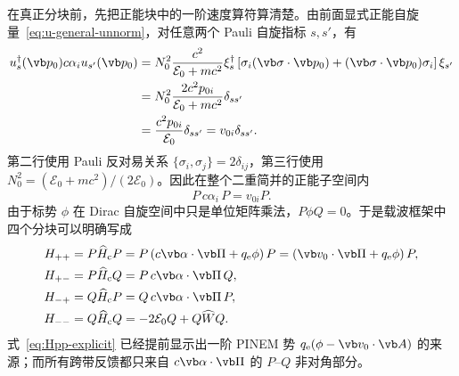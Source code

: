 在真正分块前，先把正能块中的一阶速度算符算清楚。由前面显式正能自旋量~\cref{eq:u-general-unnorm}，对任意两个 Pauli 自旋指标 $s,s'$，有
\begin{align}
 u_s^\dagger(\vb p_0)c\alpha_i u_{s'}(\vb p_0)
 &=N_0^2\frac{c^2}{\mathcal E_0+mc^2}
 \xi_s^\dagger
 \left[\sigma_i(\vb\sigma\cdot\vb p_0)
 +(\vb\sigma\cdot\vb p_0)\sigma_i\right]\xi_{s'}\\
 &=N_0^2\frac{2c^2p_{0i}}{\mathcal E_0+mc^2}
 \delta_{ss'}\\
 &=\frac{c^2p_{0i}}{\mathcal E_0}\delta_{ss'}
 =v_{0i}\delta_{ss'}.
\label{eq:projected-alpha-velocity-explicit}
\end{align}
第二行使用 Pauli 反对易关系
$\{\sigma_i,\sigma_j\}=2\delta_{ij}$，第三行使用
$N_0^2=(\mathcal E_0+mc^2)/(2\mathcal E_0)$。因此在整个二重简并的正能子空间内
\begin{equation}
{P\,c\alpha_i\,P=v_{0i}P.}
\label{eq:projected-alpha-velocity}
\end{equation}
由于标势 $\phi$ 在 Dirac 自旋空间中只是单位矩阵乘法，$P\phi Q=0$。于是载波框架中四个分块可以明确写成
\begin{align}
H_{++}&=P\widehat H_{\rm c}P
=P\left(c\vb\alpha\cdot\vb\Pi+q_{\rm e}\phi\right)P
=\left(\vb v_0\cdot\vb\Pi+q_{\rm e}\phi\right)P,
\label{eq:Hpp-explicit}\\
H_{+-}&=P\widehat H_{\rm c}Q
=P\,c\vb\alpha\cdot\vb\Pi\,Q,
\label{eq:Hpq-explicit}\\
H_{-+}&=Q\widehat H_{\rm c}P
=Q\,c\vb\alpha\cdot\vb\Pi\,P,
\label{eq:Hqp-explicit}\\
H_{--}&=Q\widehat H_{\rm c}Q
=-2\mathcal E_0Q+Q\widehat WQ.
\label{eq:Hqq-explicit}
\end{align}
式~\cref{eq:Hpp-explicit} 已经提前显示出一阶 PINEM 势
$q_{\rm e}(\phi-\vb v_0\cdot\vb A)$ 的来源；而所有跨带反馈都只来自 $c\vb\alpha\cdot\vb\Pi$ 的 $P$--$Q$ 非对角部分。

